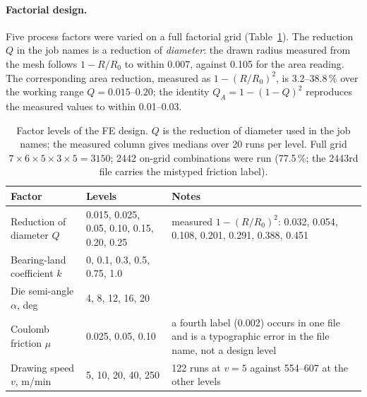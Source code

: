 \paragraph{Factorial design.}
Five process factors were varied on a full factorial grid (Table~\ref{tab:factors}). The reduction $Q$ in the job names is a reduction of \emph{diameter}: the drawn radius measured from the mesh follows $1 - R/R_0$ to within 0.007, against 0.105 for the area reading. %
The corresponding area reduction, measured as $1-(R/R_0)^2$, is 3.2--38.8\,\% over the working range $Q = 0.015$--$0.20$; the identity $Q_A = 1 - (1-Q)^2$ reproduces the measured values to within 0.01--0.03. %

\begin{table}[htbp]
\centering\small
\caption{Factor levels of the FE design. $Q$ is the reduction of diameter used in the job names; the measured column gives medians over 20 runs per level. Full grid $7\times6\times5\times3\times5 = 3150$; 2442 on-grid combinations were run (77.5\,\%; the 2443rd file carries the mistyped friction label).} %
\label{tab:factors}
\begin{tabular}{@{}lll@{}}
\toprule
Factor & Levels & Notes \\
\midrule
Reduction of diameter $Q$ & 0.015, 0.025, 0.05, 0.10, 0.15, 0.20, 0.25 & measured $1-(R/R_0)^2$: 0.032, 0.054, 0.108, 0.201, 0.291, 0.388, 0.451 \\ %
Bearing-land coefficient $k$ & 0, 0.1, 0.3, 0.5, 0.75, 1.0 & \\ %
Die semi-angle $\alpha$, deg & 4, 8, 12, 16, 20 & \\ %
Coulomb friction $\mu$ & 0.025, 0.05, 0.10 & a fourth label (0.002) occurs in one file and is a typographic error in the file name, not a design level \\ %
Drawing speed $v$, m/min & 5, 10, 20, 40, 250 & 122 runs at $v=5$ against 554--607 at the other levels \\ %
\bottomrule
\end{tabular}
\end{table}

